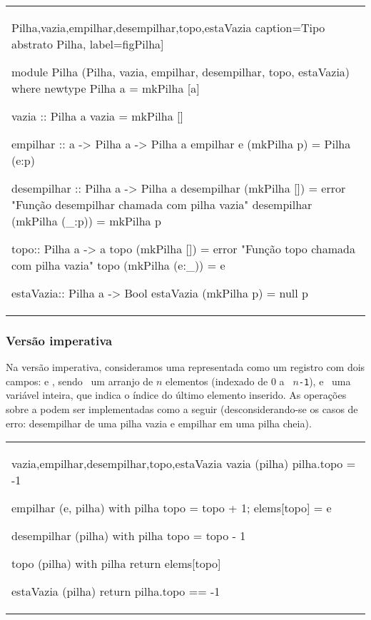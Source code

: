 \begin{center}
\begin{tabular}{l}
\begin{hask}{Pilha,vazia,empilhar,desempilhar,topo,estaVazia}{}
caption={Tipo abstrato Pilha},%
label={figPilha}]

module Pilha (Pilha, vazia, empilhar, desempilhar, topo, estaVazia) where
   newtype Pilha a = mkPilha [a] 

   vazia :: Pilha a
   vazia = mkPilha []
   
   empilhar :: a -> Pilha a -> Pilha a
   empilhar e (mkPilha p) = Pilha (e:p)

   desempilhar :: Pilha a -> Pilha a
   desempilhar (mkPilha [])    = error "Função desempilhar chamada com pilha vazia"
   desempilhar (mkPilha (_:p)) = mkPilha p

   topo:: Pilha a -> a
   topo (mkPilha [])    = error "Função topo chamada com pilha vazia"
   topo (mkPilha (e:_)) = e 
  
   estaVazia:: Pilha a -> Bool
   estaVazia (mkPilha p) = null p
\end{hask}
\end{tabular}
\end{center}

\subsubsection{Versão imperativa}

Na versão imperativa, consideramos uma  representada como
um registro com dois campos:  e , sendo
\ um arranjo de $n$ elementos (indexado de $0$ a {\tt
  $n$-1}), e \ uma variável inteira, que indica o índice do
último elemento inserido. As operações sobre a  podem ser
implementadas como a seguir (desconsiderando-se os casos de erro:
desempilhar de uma pilha vazia e empilhar em uma pilha cheia).

\begin{center}
\begin{tabular}{l}
\begin{alg}{vazia,empilhar,desempilhar,topo,estaVazia}{}
vazia (pilha) { pilha.topo = -1 }

empilhar (e, pilha) 
   with pilha { topo = topo + 1; elems[topo] = e }

desempilhar (pilha) 
   with pilha { topo = topo - 1 }
   
topo (pilha)
   with pilha { return elems[topo] }  
  
estaVazia (pilha) { return pilha.topo == -1 }
\end{alg}
\end{tabular}
\end{center}

